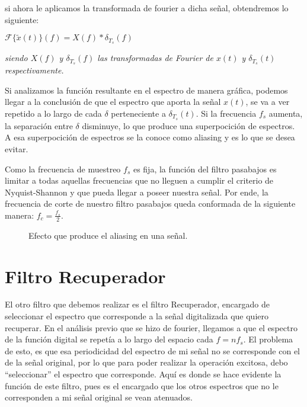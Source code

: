 \documentclass[../../ASSD_TP1_G7.tex]{subfiles}
\begin{document}
si ahora le aplicamos la transformada de fourier a dicha señal, obtendremos
lo siguiente:
\begin{center}
{\Large{}$\mathcal{F}\{\tilde{x}(t)\}(f)=X(f)*\delta_{T_{s}}(f)$}{\Large\par}
\par\end{center}

\begin{center}
\textit{\footnotesize{}siendo $X(f)$ y $\delta_{T_{s}}(f)$ las transformadas
de Fourier de $x(t)$ y $\delta_{T_{s}}(t)$ respectivamente. }{\footnotesize\par}
\par\end{center}

Si analizamos la función resultante en el espectro de manera gráfica,
podemos llegar a la conclusión de que el espectro que aporta la señal
$x(t)$, se va a ver repetido a lo largo de cada $\delta$ perteneciente
a $\delta_{T_{s}}(t)$. Si la frecuencia $f_{s}$ aumenta, la separación
entre $\delta$ disminuye, lo que produce una superpocición de espectros.
A esa superpocición de espectros se la conoce como aliasing y es lo
que se desea evitar.

Como la frecuencia de muestreo $f_{s}$ es fija, la función del filtro
pasabajos es limitar a todas aquellas frecuencias que no lleguen a
cumplir el criterio de Nyquist-Shannon y que pueda llegar a poseer
nuestra señal. Por ende, la frecuencia de corte de nuestro filtro
pasabajos queda conformada de la siguiente manera: $f_{c}=\frac{f_{s}}{2}$.

\begin{figure}[H]

\caption{Efecto que produce el aliasing en una señal.}

\end{figure}
\section{Filtro Recuperador}

El otro filtro que debemos realizar es el filtro Recuperador, encargado
de seleccionar el espectro que corresponde a la señal digitalizada
que quiero recuperar. En el análisis previo que se hizo de fourier,
llegamos a que el espectro de la función digital se repetía a lo largo
del espacio cada $f=nf_{s}$. El problema de esto, es que esa periodicidad
del espectro de mi señal no se corresponde con el de la señal original,
por lo que para poder realizar la operación excitosa, debo ``seleccionar''
el espectro que corresponde. Aquí es donde se hace evidente la función
de este filtro, pues es el encargado que los otros espectros que no
le corresponden a mi señal original se vean atenuados. 
\end{document}
